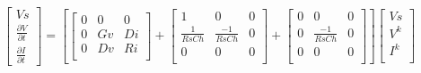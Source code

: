 \documentclass[12pt, letterpaper]{article}
\begin{document}
\begin{equation}
	\begin{bmatrix}
		Vs \\
		\frac{\partial{V}}{\partial{t}} \\
		\frac{\partial{I}}{\partial{t}} 
	\end{bmatrix}	
	=
	\left[ 
	\begin{bmatrix}
		0 & 0 & 0 \\
		0 & Gv & Di \\
		0 & Dv & Ri \\
	\end{bmatrix}
	+
	\begin{bmatrix}
		1 & 0 & 0 \\
		\frac{1}{Rs C h} & \frac{-1}{Rs C h} & 0 \\
		0 & 0 & 0 \\
	\end{bmatrix}
	+
	\begin{bmatrix}
		0 & 0 & 0 \\
		0 & \frac{-1}{Rs C h} & 0 \\
		0 & 0 & 0 \\
	\end{bmatrix}
	\right]
	\begin{bmatrix}
		Vs \\
		V^k \\
		I^k \\
	\end{bmatrix}
\end{equation}


	
\end{document}
